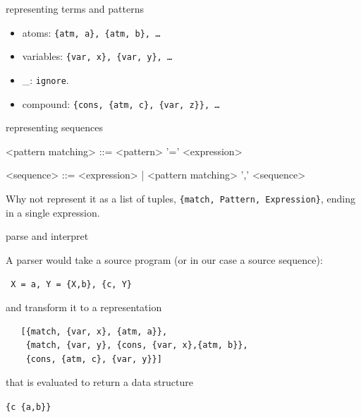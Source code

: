 \begin{frame}[fragile]{representing terms and patterns}

\pause\vspace{20pt}
\begin{itemize}
 \pause \item atoms: {\tt \{atm, a\}, \{atm, b\}, \ldots} 
 \pause \item variables: {\tt \{var, x\}, \{var, y\}, \ldots} 
 \pause \item \_:  \verb+ignore+.
 \pause \item compound: {\tt \{cons, \{atm, c\}, \{var, z\}\}, \ldots}
\end{itemize}

\end{frame}

\begin{frame}[fragile]{representing sequences}

\begin{grammar}
<pattern matching> ::=  <pattern> '=' <expression>

<sequence> ::=  <expression> | <pattern matching> ',' <sequence>
\end{grammar}

\pause\vspace{20pt} Why not represent it as a list of tuples, \verb+{match, Pattern, Expression}+, ending in a single expression.

\end{frame}

\begin{frame}[fragile]{parse and interpret}

\pause A parser would take a source program (or in our case a source sequence):

\pause\vspace{10pt}\hspace{40pt}\verb+ X = a, Y = {X,b}, {c, Y}+

\pause \vspace{10pt} and transform it to a representation

\pause\vspace{10pt}
\begin{verbatim}
   [{match, {var, x}, {atm, a}}, 
    {match, {var, y}, {cons, {var, x},{atm, b}}, 
    {cons, {atm, c}, {var, y}}]
\end{verbatim}
\pause \vspace{10pt} that is evaluated to return a data structure

\pause\vspace{10pt}\hspace{40pt}\verb+{c {a,b}}+

\end{frame}


